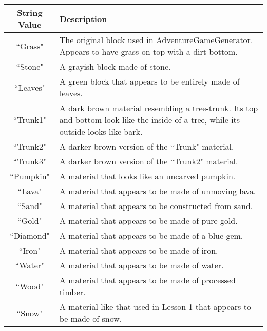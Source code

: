 \documentclass{article}
\begin{document}
\begin{center}
\begin{tabular}{ | c | m{10cm} | } 
 \hline
 String Value & Description \\ 
  \hline
  ``Grass" & The original block used in AdventureGameGenerator. Appears to have grass on top with a dirt bottom.  \\ 
  \hline
 ``Stone" & A grayish block made of stone.\\ 
 \hline
  ``Leaves" & A green block that appears to be entirely made of leaves.\\ 
 \hline
   ``Trunk1" & A dark brown material resembling a tree-trunk. Its top and bottom look like the inside of a tree, while its outside looks like bark.\\ 
 \hline
 ``Trunk2" & A darker brown version of the ``Trunk" material.\\ 
 \hline
 ``Trunk3" & A darker brown version of the ``Trunk2" material.\\ 
 \hline
 ``Pumpkin" & A material that looks like an uncarved pumpkin. \\ 
 \hline
 ``Lava" & A material that appears to be made of unmoving lava. \\ 
 \hline
 ``Sand" & A material that appears to be constructed from sand. \\ 
 \hline
 ``Gold" & A material that appears to be made of pure gold.\\ 
 \hline
  ``Diamond" & A material that appears to be made of a blue gem.\\ 
 \hline
 ``Iron" & A material that appears to be made of iron.\\ 
 \hline
  ``Water" & A material that appears to be made of water.\\ 
 \hline
 ``Wood" & A material that appears to be made of processed timber.\\ 
 \hline
 ``Snow" & A material like that used in Lesson 1 that appears to be made of snow.\\ 
 \hline
\end{tabular}
\end{center}
\end{document}
